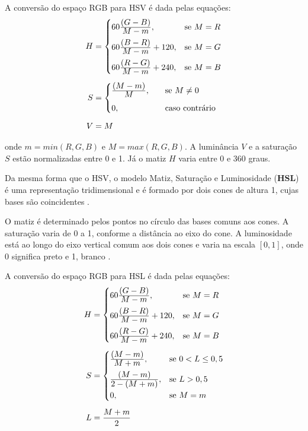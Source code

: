 A conversão do espaço RGB para HSV é dada pelas equações:
\begin{align}
\label{eq:rgb_para_hsv}
\begin{split}
  H &=  \begin{cases}
            60\frac{\displaystyle (G - B)}{\displaystyle M - m}, & \text{se}\ M = R\\[0.7em]
            60\frac{\displaystyle (B - R)}{\displaystyle M - m} + 120, & \text{se}\ M = G\\[0.7em]
            60\frac{\displaystyle (R - G)}{\displaystyle M - m} + 240, & \text{se}\ M = B
       \end{cases}
  \\[0.5em]
  S &=  \begin{cases}
            \frac{\displaystyle (M - m)}{\displaystyle M}, \quad &\text{se}\ M \neq 0\\[0.7em]
            0, \quad &\text{caso contrário}\\
       \end{cases}
  \\[0.5em]
  V &= M
\end{split}
\end{align}

\noindent onde $m = min(R, G ,B)$ e $M = max(R, G ,B)$. A luminância $V$ e a saturação $S$ estão normalizadas entre 0 e 1. Já o matiz $H$ varia entre 0 e 360 graus.

Da mesma forma que o HSV, o modelo Matiz, Saturação e Luminosidade (\textbf{HSL}) é uma representação tridimensional e é formado por dois cones de altura 1, cujas bases são coincidentes \citep{pedrini:08}.

O matiz é determinado pelos pontos no círculo das bases comuns aos cones. A saturação varia de 0 a 1, conforme a distância ao eixo do cone. A luminosidade está ao longo do eixo vertical comum aos dois cones e varia na escala $[0, 1]$, onde 0 significa preto e 1, branco \citep{pedrini:08}.

A conversão do espaço RGB para HSL é dada pelas equações:
\begin{align}
\label{eq:rgb_para_hsl}
\begin{split}
  H &=  \begin{cases}
            60\frac{\displaystyle (G - B)}{\displaystyle M - m}, & \text{se}\ M = R\\[0.7em]
            60\frac{\displaystyle (B - R)}{\displaystyle M - m} + 120, & \text{se}\ M = G\\[0.7em]
            60\frac{\displaystyle (R - G)}{\displaystyle M - m} + 240, & \text{se}\ M = B
       \end{cases}
  \\[0.5em]
  S &=  \begin{cases}
            \frac{\displaystyle (M - m)}{\displaystyle M + m}, & \text{se}\ 0 < L \leq 0,5\\[0.7em]
            \frac{\displaystyle (M - m)}{\displaystyle 2 - (M + m)}, & \text{se}\ L > 0,5\\[0.5em]
            0, & \text{se}\ M = m\\
       \end{cases}
  \\[0.5em]
  L &= \frac{M + m}{2}
\end{split}
\end{align}


